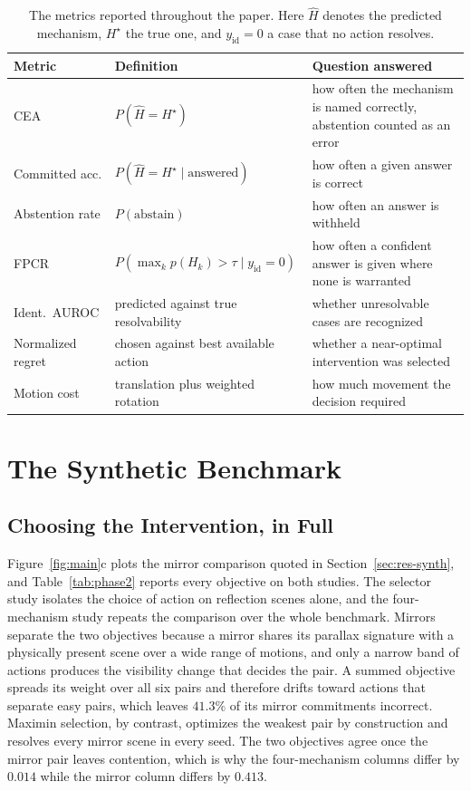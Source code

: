 \documentclass{article} %
\theoremstyle{defstyle}
\theoremstyle{plain}
\begin{document}
\begin{table}[htb]
\caption{The metrics reported throughout the paper. Here $\hat{H}$ denotes the predicted
mechanism, $H^\star$ the true one, and $y_{\mathrm{id}} = 0$ a case that no action resolves.}
\label{tab:supp-metrics}
\begin{center}
\footnotesize
\setlength{\tabcolsep}{3pt}
\begin{tabular}{llp{5.6cm}}
\toprule
\textbf{Metric} & \textbf{Definition} & \textbf{Question answered} \\
\midrule
CEA & $P(\hat{H} = H^\star)$ & how often the mechanism is named correctly, abstention counted as an error \\
Committed acc. & $P(\hat{H} = H^\star \mid \text{answered})$ & how often a given answer is correct \\
Abstention rate & $P(\text{abstain})$ & how often an answer is withheld \\
FPCR & $P(\max_k p(H_k) > \tau \mid y_{\mathrm{id}} = 0)$ & how often a confident answer is given where none is warranted \\
Ident.\ AUROC & predicted against true resolvability & whether unresolvable cases are recognized \\
Normalized regret & chosen against best available action & whether a near-optimal intervention was selected \\
Motion cost & translation plus weighted rotation & how much movement the decision required \\
\bottomrule
\end{tabular}
\end{center}
\end{table}

\section{The Synthetic Benchmark}

\subsection{Choosing the Intervention, in Full}
\label{sec:supp-phase2}

Figure~\ref{fig:main}c plots the mirror comparison quoted in Section~\ref{sec:res-synth}, and
Table~\ref{tab:phase2} reports every objective on both studies. The selector study isolates the
choice of action on reflection scenes alone, and the four-mechanism study repeats the
comparison over the whole benchmark. Mirrors separate the two objectives because a mirror
shares its parallax signature with a physically present scene over a wide range of motions, and
only a narrow band of actions produces the visibility change that decides the pair. A summed
objective spreads its weight over all six pairs and therefore drifts toward actions that
separate easy pairs, which leaves $41.3\%$ of its mirror commitments incorrect. Maximin
selection, by contrast, optimizes the weakest pair by construction and resolves every mirror
scene in every seed. The two objectives agree once the mirror pair leaves contention, which is
why the four-mechanism columns differ by $0.014$ while the mirror column differs by $0.413$.
\end{document}
